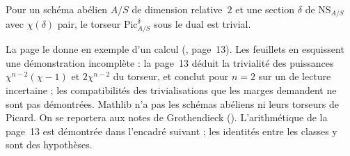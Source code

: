 \begin{encadre}
\begin{exemple*}\nonverifie
Pour un schéma abélien $A/S$ de dimension relative~$2$ et une section $\delta$ de $\mathrm{NS}_{A/S}$ avec $\chi(\delta)$ pair, le torseur $\mathrm{Pic}^\delta_{A/S}$ sous le dual est trivial.
\end{exemple*}
\end{encadre}
{\small La page le donne en exemple d'un calcul (, page~13). Les feuillets en esquissent une démonstration incomplète : la page~13 déduit la trivialité des puissances $\chi^{n-2}(\chi - 1)$ et $2\chi^{n-2}$ du torseur, et conclut pour $n = 2$ sur un  de lecture incertaine ; les compatibilités des trivialisations que les marges demandent ne sont pas démontrées. Mathlib n'a pas les schémas abéliens ni leurs torseurs de Picard. On se reportera aux notes de Grothendieck (). L'arithmétique de la page~13 est démontrée dans l'encadré suivant ; les identités entre les classes y sont des hypothèses.\par}

